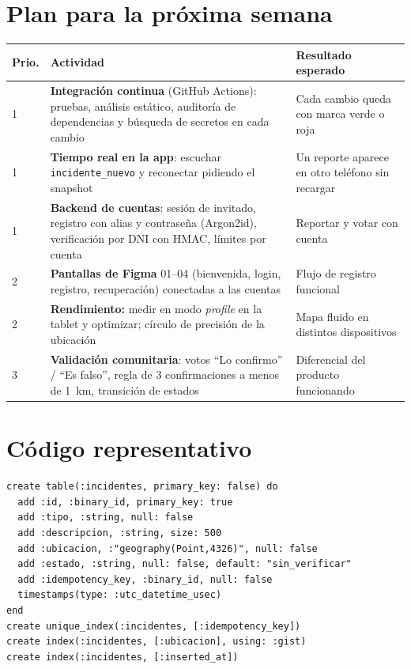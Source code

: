 \documentclass[10pt,a4paper]{article}
\newcommand{\ruta}[1]{\texttt{\footnotesize #1}}
\begin{document}
\section{Plan para la próxima semana}
{\footnotesize
\begin{tabular}{@{}p{0.8cm}p{10.8cm}p{4.8cm}@{}}
\toprule
\textbf{Prio.} & \textbf{Actividad} & \textbf{Resultado esperado}\\
\midrule
1 & \textbf{Integración continua} (GitHub Actions): pruebas, análisis estático, auditoría de dependencias y búsqueda de secretos en cada cambio & Cada cambio queda con marca verde o roja\\
1 & \textbf{Tiempo real en la app}: escuchar \texttt{incidente\_nuevo} y reconectar pidiendo el snapshot & Un reporte aparece en otro teléfono sin recargar\\
1 & \textbf{Backend de cuentas}: sesión de invitado, registro con alias y contraseña (Argon2id), verificación por DNI con HMAC, límites por cuenta & Reportar y votar con cuenta\\
2 & \textbf{Pantallas de Figma} 01--04 (bienvenida, login, registro, recuperación) conectadas a las cuentas & Flujo de registro funcional\\
2 & \textbf{Rendimiento:} medir en modo \emph{profile} en la tablet y optimizar; círculo de precisión de la ubicación & Mapa fluido en distintos dispositivos\\
3 & \textbf{Validación comunitaria}: votos ``Lo confirmo'' / ``Es falso'', regla de 3 confirmaciones a menos de 1~km, transición de estados & Diferencial del producto funcionando\\
\bottomrule
\end{tabular}}


\appendix
\section{Código representativo}
\begin{lstlisting}[caption={Migración de la tabla \texttt{incidentes} (\ruta{backend/priv/repo/migrations/20261027172454\_create\_incidentes.exs}).}]
create table(:incidentes, primary_key: false) do
  add :id, :binary_id, primary_key: true
  add :tipo, :string, null: false
  add :descripcion, :string, size: 500
  add :ubicacion, :"geography(Point,4326)", null: false
  add :estado, :string, null: false, default: "sin_verificar"
  add :idempotency_key, :binary_id, null: false
  timestamps(type: :utc_datetime_usec)
end
create unique_index(:incidentes, [:idempotency_key])
create index(:incidentes, [:ubicacion], using: :gist)
create index(:incidentes, [:inserted_at])
\end{lstlisting}




\end{document}
